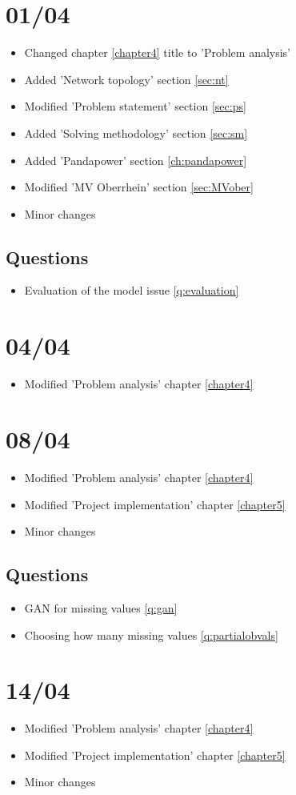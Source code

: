 \section{01/04}
\begin{itemize}
    \item Changed chapter \ref{chapter4} title to 'Problem analysis'
    \item Added 'Network topology' section \ref{sec:nt}
    \item Modified 'Problem statement' section \ref{sec:ps}
    \item Added 'Solving methodology' section \ref{sec:sm}
    \item Added 'Pandapower' section \ref{ch:pandapower}
    \item Modified 'MV Oberrhein' section \ref{sec:MVober}
    \item Minor changes
\end{itemize}

\subsection{Questions}
\begin{itemize}
    \item Evaluation of the model issue \ref{q:evaluation}
\end{itemize}

\section{04/04}
\begin{itemize}
    \item Modified 'Problem analysis' chapter \ref{chapter4}
\end{itemize}

\section{08/04}
\begin{itemize}
    \item Modified 'Problem analysis' chapter \ref{chapter4}
    \item Modified 'Project implementation' chapter \ref{chapter5}
    \item Minor changes
\end{itemize}

\subsection{Questions}
\begin{itemize}
    \item \gls{GAN} for missing values \ref{q:gan}
    \item Choosing how many missing values \ref{q:partialobvals}
\end{itemize}

\section{14/04}
\begin{itemize}
    \item Modified 'Problem analysis' chapter \ref{chapter4}
    \item Modified 'Project implementation' chapter \ref{chapter5}
    \item Minor changes
\end{itemize}